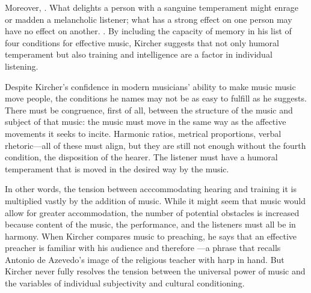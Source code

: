 Moreover, .%
    \Autocite
    [544: .]
    {Kircher:Musurgia}
What delights a person with a sanguine temperament might enrage or madden a melancholic listener; what has a strong effect on one person may have no effect on another.%
    \Autocite[550]{Kircher:Musurgia}
.%
    \Autocite[550: .]
    {Kircher:Musurgia}
By including the capacity of memory in his list of four conditions for effective music, Kircher suggests that not only humoral temperament but also training and intelligence are a factor in individual listening.

Despite Kircher's confidence in modern musicians' ability to make music music move people, the conditions he names may not be as easy to fulfill as he suggests.
There must be congruence, first of all, between the structure of the music and subject of that music: the music must move in the same way as the affective movements it seeks to incite.
Harmonic ratios, metrical proportions, verbal rhetoric---all of these must align, but they are still not enough without the fourth condition, the disposition of the hearer.
The listener must have a humoral temperament that is moved in the desired way by the music. 

In other words, the tension between acccommodating hearing and training it is multiplied vastly by the addition of music.
While it might seem that music would allow for greater accommodation, the number of potential obstacles is increased because content of the music, the performance, and the listeners must all be in harmony.
When Kircher compares music to preaching, he says that an effective preacher is familiar with his audience and therefore ---a phrase that recalls Antonio de Azevedo's image of the religious teacher with harp in hand.%
    \Autocite
    [551: .]
    {Kircher:Musurgia}
But Kircher never fully resolves the tension between the universal power of music and the variables of individual subjectivity and cultural conditioning.


